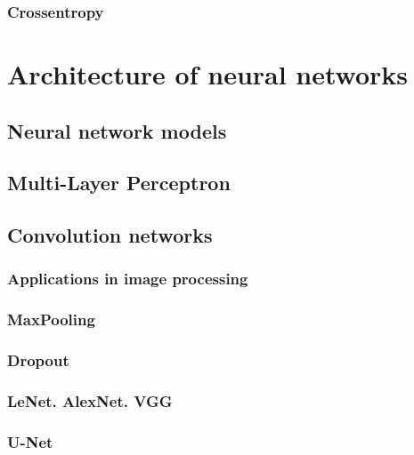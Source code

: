\subsubsection{Crossentropy}
\label{subsubsec:ch3sec2subsec4subsubsec3}

\section{Architecture of neural networks}
\label{sec:ch3sec3}

\subsection{Neural network models}
\label{subsec:ch3sec3subsec1}

\subsection{Multi-Layer Perceptron}
\label{subsec:ch3sec3subsec2}

\subsection{Convolution networks}
\label{subsec:ch3sec3subsec3}

\subsubsection{Applications in image processing}
\label{subsubsec:ch3sec3subsec3subsubsec1}

\subsubsection{MaxPooling}
\label{subsubsec:ch3sec3subsec3subsubsec2}

\subsubsection{Dropout}
\label{subsubsec:ch3sec3subsec3subsubsec3}

\subsubsection{LeNet. AlexNet. VGG}
\label{subsubsec:ch3sec3subsec3subsubsec4}

\subsubsection{U-Net}
\label{subsubsec:ch3sec3subsec3subsubsec4}

